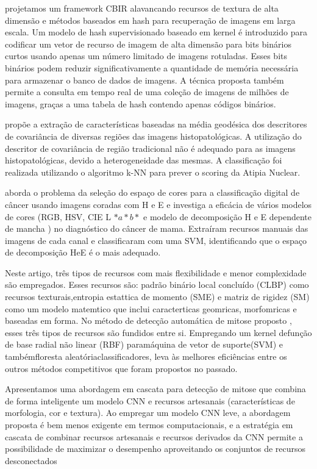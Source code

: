\documentclass[preprint,12pt,authoryear]{elsarticle}
\begin{document}
\cite{ZHANG2015} projetamos um framework CBIR alavancando recursos de textura de alta dimensão e métodos baseados em hash para recuperação de imagens em larga escala. Um modelo de hash supervisionado baseado em kernel é introduzido para codificar um vetor de recurso de imagem de alta dimensão para bits binários curtos usando apenas um número limitado de imagens rotuladas. Esses bits binários podem reduzir significativamente a quantidade de memória necessária para armazenar o banco de dados de imagens. A técnica proposta também permite a consulta em tempo real de uma coleção de imagens de milhões de imagens, graças a uma tabela de hash contendo apenas códigos binários.

\cite{KHAN2015} propõe a extração de características baseadas na média geodésica dos descritores de covariância de diversas regiões das imagens histopatológicas. A utilização do descritor de covariância de região tradicional não é adequado para as imagens histopatológicas, devido a heterogeneidade das mesmas. A classificação foi realizada utilizando o algoritmo k-NN para prever o scoring da Atipia Nuclear.

\cite{LI2015} aborda o problema da seleção do espaço de cores para a classificação digital de câncer usando imagens coradas com H e E e investiga a eficácia de vários modelos de cores (RGB, HSV, CIE L $* a * b *$ e modelo de decomposição H e E dependente de mancha ) no diagnóstico do câncer de mama. Extraíram recursos manuais das imagens de cada canal e classificaram com uma SVM, identificando que o espaço de decomposição HeE é o mais adequado.

\cite{TASHK2015} Neste artigo, três tipos de recursos com mais flexibilidade e menor complexidade são empregados. Esses recursos são: padrão binário local concluído (CLBP) como recursos texturais,entropia estattica de momento (SME) e matriz de rigidez (SM) como um modelo matemtico que inclui caracterticas geomricas, morfomricas e baseadas em forma. No método de detecção automática de mitose proposto , esses três tipos de recursos são fundidos entre si. Empregando um kernel defunção de base radial não linear (RBF) paramáquina de vetor de suporte(SVM) e tambémfloresta aleatóriaclassificadores, leva às melhores eficiências entre os outros métodos competitivos que foram propostos no passado. 

\cite{WANG2014} Apresentamos uma abordagem em cascata para detecção de mitose que combina de forma inteligente um modelo CNN e recursos artesanais (características de morfologia, cor e textura). Ao empregar um modelo CNN leve, a abordagem proposta é bem menos exigente em termos computacionais, e a estratégia em cascata de combinar recursos artesanais e recursos derivados da CNN permite a possibilidade de maximizar o desempenho aproveitando os conjuntos de recursos desconectados
\end{document}
